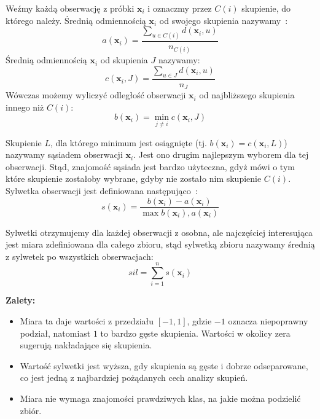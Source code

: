 \documentclass{praca1}
\begin{document}
Weźmy każdą obserwację z próbki $\mathbf{x}_i$ i oznaczmy przez $C(i)$ skupienie, do którego należy. Średnią odmiennością $\mathbf{x}_i$ od swojego skupienia nazywamy~\cite{Rousseeuw1987:silhoutte}:
\begin{equation*}
a(\mathbf{x}_i) = \frac{\sum_{u \in C(i)} d(\mathbf{x}_i, u)}{n_{C(i)}}
\end{equation*}
Średnią odmiennością $\mathbf{x}_i$ od skupienia $J$ nazywamy:
\begin{equation*}
c(\mathbf{x}_i, J) = \frac{\sum_{u \in J} d(\mathbf{x}_i, u)}{n_{J}}
\end{equation*}
Wówczas możemy wyliczyć odległość obserwacji $\mathbf{x}_i$ od najbliższego skupienia innego niż $C(i)$:
\begin{equation*}
b(\mathbf{x}_i) = \min\limits_{j \neq i} c(\mathbf{x}_i, J)
\end{equation*}

Skupienie $L$, dla którego minimum jest osiągnięte (tj. $b(\mathbf{x}_i) = c(\mathbf{x}_i, L)$) nazywamy sąsiadem obserwacji $\mathbf{x}_i$. Jest ono drugim najlepszym wyborem dla tej obserwacji. Stąd, znajomość sąsiada jest bardzo użyteczna, gdyż mówi o tym które skupienie zostałoby wybrane, gdyby nie zostało nim skupienie $C(i)$. Sylwetka obserwacji jest definiowana następująco~\cite{Rousseeuw1987:silhoutte}:
\begin{equation*}
s(\mathbf{x}_i) = \frac{b(\mathbf{x}_i) - a(\mathbf{x}_i)}{\max{b(\mathbf{x}_i), a(\mathbf{x}_i)}}
\end{equation*}

Sylwetki otrzymujemy dla każdej obserwacji z osobna, ale najczęściej interesująca jest miara zdefiniowana dla całego zbioru, stąd sylwetką zbioru nazywamy średnią z sylwetek po wszystkich obserwacjach:
\begin{equation*}
sil = \sum\limits_{i=1}^{n}s(\mathbf{x}_i)
\end{equation*}

\textbf{Zalety:}
\begin{itemize}
\item Miara ta daje wartości z przedziału $[-1, 1]$, gdzie $-1$ oznacza niepoprawny podział, natomiast $1$ to bardzo gęste skupienia. Wartości w okolicy zera sugerują nakładające się skupienia.
\item Wartość sylwetki jest wyższa, gdy skupienia są gęste i dobrze odseparowane, co jest jedną z najbardziej pożądanych cech analizy skupień.
\item Miara nie wymaga znajomości prawdziwych klas, na jakie można podzielić zbiór.
\end{itemize}
\end{document}
